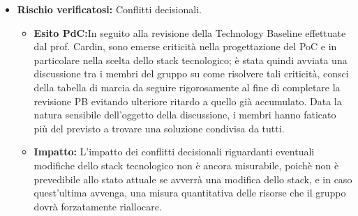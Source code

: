 \begin{itemize}
    \item \textbf{Rischio verificatosi:} Conflitti decisionali.
    \begin{itemize}
        \item \textbf{Esito PdC:}In seguito alla revisione della Technology Baseline effettuate dal prof. Cardin, sono emerse criticità nella progettazione
        del PoC e in particolare nella scelta dello stack tecnologico; è stata quindi avviata una discussione tra i membri del gruppo su come risolvere tali criticità,
        consci della tabella di marcia da seguire rigorosamente al fine di completare la revisione PB evitando ulteriore ritardo a quello già accumulato. Data la 
        natura sensibile dell'oggetto della discussione, i membri hanno faticato più del previsto a trovare una soluzione condivisa da tutti.
        \item \textbf{Impatto:} L'impatto dei conflitti decisionali riguardanti eventuali modifiche dello stack tecnologico non è ancora misurabile, poichè non è
        prevedibile allo stato attuale  se avverrà una modifica dello stack, e in caso quest'ultima avvenga, una misura quantitativa delle risorse che il gruppo dovrà
        forzatamente riallocare.
    \end{itemize}
\end{itemize}